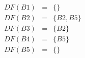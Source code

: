 \documentclass{jarticle}
\begin{document}
\begin{eqnarray*}
DF(B1) & = & \{\}\\
DF(B2) & = & \{B2, B5\}\\
DF(B3) & = & \{B2\}\\
DF(B4) & = & \{B5\}\\
DF(B5) & = & \{\}\\
\end{eqnarray*}
\end{document}

